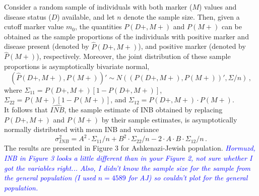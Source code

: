\documentclass[11pt]{article}
\begin{document}
Consider a random sample of individuals with both marker ($M$) values and disease status ($D$) available, and let $n$ denote the sample size. Then, given a cutoff marker value $m_0$, the quantities $P(D+,M+)$ and $P(M+)$ can be obtained as the sample proportions of the individuals with positive marker and disease present (denoted by $\hat{P}(D+,M+)$), and positive marker (denoted by $\hat{P}(M+)$), respectively. Moreover, the joint distribution of these sample proportions is asymptotically bivariate normal,
\begin{equation}\label{sample_proportions}
\left(\hat{P}(D+,M+),\hat{P}(M+) \right)' \sim N\left(\left({P}(D+,M+),{P}(M+) \right)', \Sigma/n \right)\,,
\end{equation}
where $\Sigma_{11}= {P}(D+,M+)[1-{P}(D+,M+)]$, $\Sigma_{22}= {P}(M+)[1-{P}(M+)]$, and $\Sigma_{12}= {P}(D+,M+)\cdot{P}(M+)$.\\
It follows that $\widehat{INB}$, the sample estimate of INB obtained by replacing ${P}(D+,M+)$ and ${P}(M+)$ by their sample estimates, is asymptotically normally distributed with mean INB and variance 
\begin{equation}\label{sigma_INB}
\sigma^2_{INB} = A^2\cdot \Sigma_{11}/n + B^2\cdot \Sigma_{22}/n - 2\cdot A\cdot B \cdot \Sigma_{12}/n \,.
\end{equation} 
The results are presented in Figure 3 for Ashkenazi-Jewish population. \textcolor{blue}{\it Hormuzd, INB in Figure 3 looks a little different than in your Figure 2, not sure whether I got the variables right... Also, I didn't know the sample size for the sample from the general population (I used $n=4589$ for AJ) so couldn't plot for the general population.}
\end{document}
